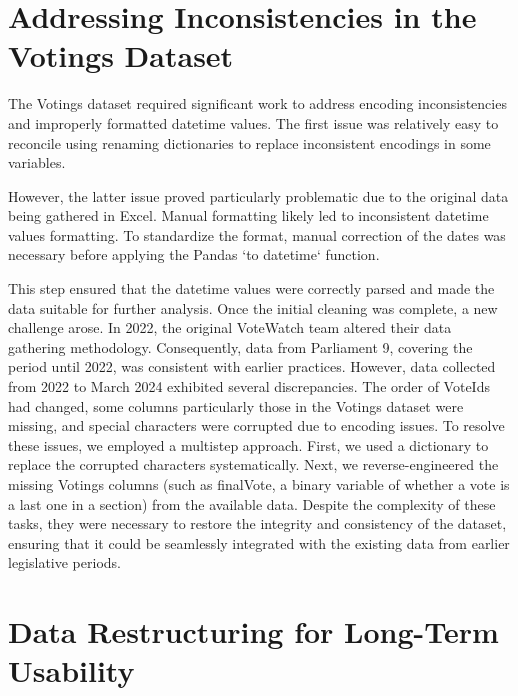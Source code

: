 \documentclass[a4paper,12pt]{report}
\begin{document}
        \section{Addressing Inconsistencies in the Votings Dataset}
            \label{sec:addressing-inconsistencies-in-the-votings-dataset}

            The Votings dataset required significant work to address encoding inconsistencies and improperly formatted
            datetime
            values.
            The first issue was relatively easy to reconcile using renaming dictionaries to replace inconsistent
            encodings in some variables.

            However, the latter issue proved particularly problematic due to the original data being gathered in Excel.
            Manual
            formatting likely led to inconsistent datetime values formatting.
            To standardize the format, manual
            correction of
            the dates was necessary before applying the Pandas `to datetime` function.

            This step ensured that the datetime values were correctly parsed and made the data suitable for further
            analysis.
            Once the initial cleaning was complete, a new challenge arose.
            In 2022, the original VoteWatch team altered
            their
            data gathering methodology.
            Consequently, data from Parliament 9, covering the period until 2022, was
            consistent
            with earlier practices.
            However, data collected from 2022 to March 2024 exhibited several discrepancies. The
            order
            of VoteIds had changed, some columns particularly those in the Votings dataset were missing, and special
            characters
            were corrupted due to encoding issues.
            To resolve these issues, we employed a multistep approach.
            First, we used a dictionary to replace the corrupted characters systematically.
            Next, we reverse-engineered the missing Votings columns (such as finalVote, a binary
            variable of whether a vote is a last one in a section) from the available data.
            Despite the complexity of these tasks,
            they were necessary to restore the integrity and consistency of the dataset, ensuring that it could
            be
            seamlessly integrated with the existing data from earlier legislative periods.


        \section{Data Restructuring for Long-Term Usability}\label{sec:data-restructuring-for-long-term-usability}
\end{document}
